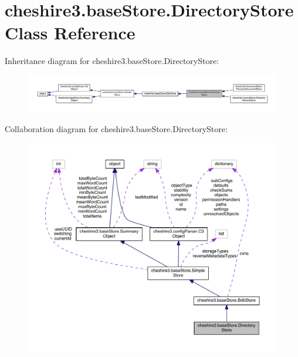 \hypertarget{classcheshire3_1_1base_store_1_1_directory_store}{\section{cheshire3.\-base\-Store.\-Directory\-Store Class Reference}
\label{classcheshire3_1_1base_store_1_1_directory_store}
}


Inheritance diagram for cheshire3.\-base\-Store.\-Directory\-Store\-:
\nopagebreak
\begin{figure}[H]
\begin{center}
\leavevmode
\includegraphics[width=350pt]{classcheshire3_1_1base_store_1_1_directory_store__inherit__graph}
\end{center}
\end{figure}


Collaboration diagram for cheshire3.\-base\-Store.\-Directory\-Store\-:
\nopagebreak
\begin{figure}[H]
\begin{center}
\leavevmode
\includegraphics[width=350pt]{classcheshire3_1_1base_store_1_1_directory_store__coll__graph}
\end{center}
\end{figure}

